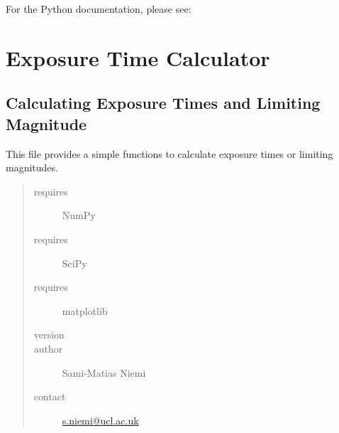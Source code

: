 \documentclass[a4paper,11pt,english]{sphinxmanual}
\begin{document}
For the Python documentation, please see:


\section{Exposure Time Calculator}
\label{ETC:exposure-time-calculator}\label{ETC::doc}\label{ETC:module-ETC.ETC}

\subsection{Calculating Exposure Times and Limiting Magnitude}
\label{ETC:calculating-exposure-times-and-limiting-magnitude}
This file provides a simple functions to calculate exposure times or limiting magnitudes.
\begin{quote}\begin{description}
\item[{requires}] \leavevmode
NumPy

\item[{requires}] \leavevmode
SciPy

\item[{requires}] \leavevmode
matplotlib

\item[{version}] 

\item[{author}] \leavevmode
Sami-Matias Niemi

\item[{contact}] \leavevmode
\href{mailto:s.niemi@ucl.ac.uk}{s.niemi@ucl.ac.uk}

\end{description}\end{quote}
\end{document}
